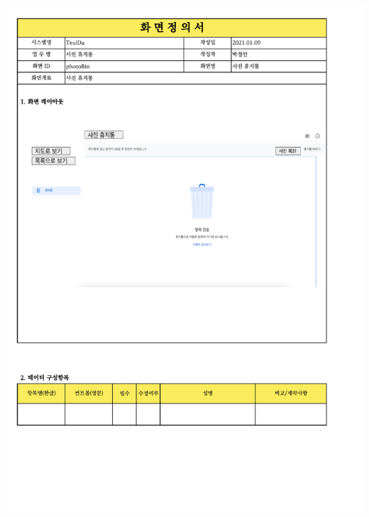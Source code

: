 {{{{{{{{{{{{{{{{{{{{{{{{{{{{{{{{{{{{{{{{\includegraphics[width=20cm]{./Figure/Analysis/Display/photo/photo_07.pdf} \\
}}}}}}}}}}}}}}}}}}}}}}}}}}}}}}}}}}}}}}}}
